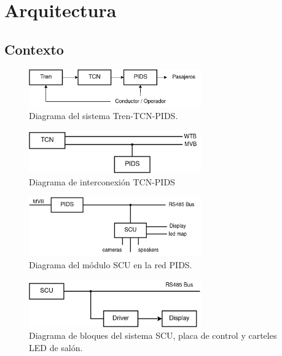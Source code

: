 \pagebreak

\section{Arquitectura}

\subsection{Contexto}
\begin{figure}[ht]
	\centering
	\includegraphics[width=0.66\textwidth]{./Figures/diagTrenTcnPids.png}
	\caption{Diagrama del sistema Tren-TCN-PIDS.}
	\label{fig:diagTrenTcnPids}
\end{figure}

\begin{figure}[ht]
	\centering
	\includegraphics[width=0.66\textwidth]{./Figures/diagTcnPidsBusesWtbMvb.png}
	\caption{Diagrama de interconexión TCN-PIDS}
	\label{fig:diagTcnPidsBuusesWtbMvb}
\end{figure}


\begin{figure}[ht]
	\centering
	\includegraphics[width=0.66\textwidth]{./Figures/diagPidsScuDevices.png}
	\caption{Diagrama del módulo SCU en la red PIDS.}
	\label{fig:diagPidsScuDevices}
\end{figure}

\begin{figure}[ht]
	\centering
	\includegraphics[width=0.66\textwidth]{./Figures/diagScuDriverDisplay.png}
	\caption{Diagrama de bloques del sistema SCU, placa de control y carteles LED de salón.}
	\label{fig:diagScuDriverDisplay}
\end{figure}

